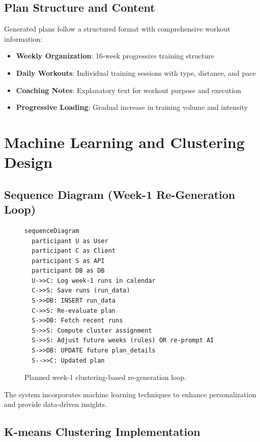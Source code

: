 \subsection{Plan Structure and Content}

Generated plans follow a structured format with comprehensive workout information:

\begin{itemize}
    \item \textbf{Weekly Organization}: 16-week progressive training structure
    \item \textbf{Daily Workouts}: Individual training sessions with type, distance, and pace
    \item \textbf{Coaching Notes}: Explanatory text for workout purpose and execution
    \item \textbf{Progressive Loading}: Gradual increase in training volume and intensity
\end{itemize}

\section{Machine Learning and Clustering Design}

\subsection*{Sequence Diagram (Week-1 Re-Generation Loop)}
\begin{figure}[h]
\centering
\begin{minipage}{0.95\linewidth}
\begin{verbatim}
sequenceDiagram
  participant U as User
  participant C as Client
  participant S as API
  participant DB as DB
  U->>C: Log week-1 runs in calendar
  C->>S: Save runs (run_data)
  S->>DB: INSERT run_data
  C->>S: Re-evaluate plan
  S->>DB: Fetch recent runs
  S->>S: Compute cluster assignment
  S->>S: Adjust future weeks (rules) OR re-prompt AI
  S->>DB: UPDATE future plan_details
  S-->>C: Updated plan
\end{verbatim}
\end{minipage}
\caption{Planned week-1 clustering-based re-generation loop.}
\end{figure}


The system incorporates machine learning techniques to enhance personalization and provide data-driven insights.

\subsection{K-means Clustering Implementation}

